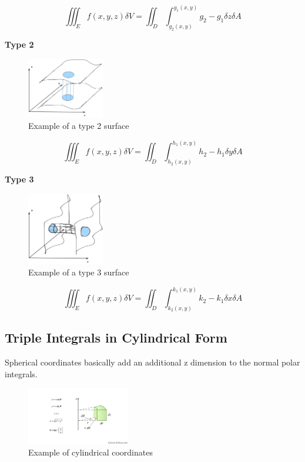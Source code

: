 \documentclass{article}
\begin{document}
$$\iiint_E f(x, y, z) \delta V = \iint_D \int_{g_2(x, y)}^{g_1(x, y)} g_2 - g_1 \delta z \delta A$$

\textbf{Type 2}

\begin{figure}[H]
    \centering
    \includegraphics[width=0.3\textwidth]{figures/type2surfaces.png}
    \caption{Example of a type 2 surface}
\end{figure}

$$\iiint_E f(x, y, z) \delta V = \iint_D \int_{h_2(x, y)}^{h_1(x, y)} h_2 - h_1 \delta y \delta A$$

\textbf{Type 3}

\begin{figure}[H]
    \centering
    \includegraphics[width=0.3\textwidth]{figures/type3surfaces.png}
    \caption{Example of a type 3 surface}
\end{figure}

$$\iiint_E f(x, y, z) \delta V = \iint_D \int_{k_2(x, y)}^{k_1(x, y)} k_2 - k_1 \delta x \delta A$$


\subsection{Triple Integrals in Cylindrical Form}

Spherical coordinates basically add an additional z dimension to the normal polar integrals.

\begin{figure}[H]
    \centering
    \includegraphics[width=0.4\textwidth]{figures/cylindrical.png}
    \caption{Example of cylindrical coordinates}
\end{figure}
\end{document}
